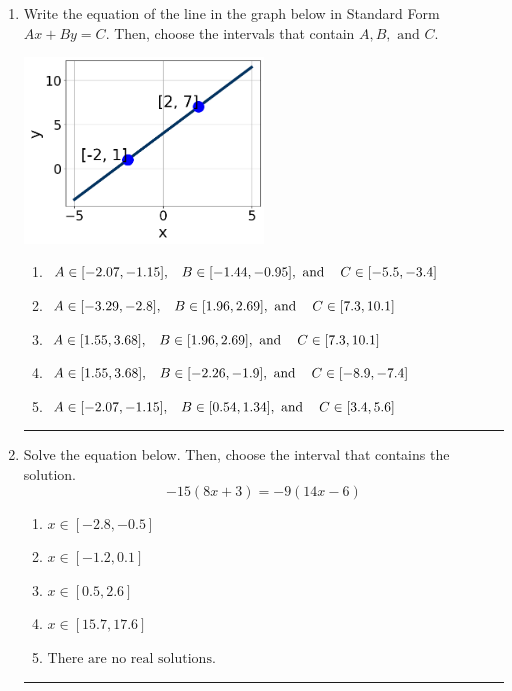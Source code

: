 \documentclass[14pt]{extbook}
\newcommand{\litem}[1]{\item#1\hspace*{-1cm}\rule{\textwidth}{0.4pt}}
\begin{document}
\begin{enumerate}
{\begin{enumerate}[label=\Alph*.]
\end{enumerate} }
\litem{
Write the equation of the line in the graph below in Standard Form $Ax+By=C$. Then, choose the intervals that contain $A, B, \text{ and } C$.
\begin{center}
    \includegraphics[width=0.5\textwidth]{../Figures/linearGraphToStandardC.png}
\end{center}
\begin{enumerate}[label=\Alph*.]
\item \( A \in [-2.07, -1.15], \hspace{3mm} B \in [-1.44, -0.95], \text{ and } \hspace{3mm} C \in [-5.5, -3.4] \)
\item \( A \in [-3.29, -2.8], \hspace{3mm} B \in [1.96, 2.69], \text{ and } \hspace{3mm} C \in [7.3, 10.1] \)
\item \( A \in [1.55, 3.68], \hspace{3mm} B \in [1.96, 2.69], \text{ and } \hspace{3mm} C \in [7.3, 10.1] \)
\item \( A \in [1.55, 3.68], \hspace{3mm} B \in [-2.26, -1.9], \text{ and } \hspace{3mm} C \in [-8.9, -7.4] \)
\item \( A \in [-2.07, -1.15], \hspace{3mm} B \in [0.54, 1.34], \text{ and } \hspace{3mm} C \in [3.4, 5.6] \)

\end{enumerate} }
\litem{
Solve the equation below. Then, choose the interval that contains the solution.\[ -15(8x + 3) = -9(14x -6) \]\begin{enumerate}[label=\Alph*.]
\item \( x \in [-2.8, -0.5] \)
\item \( x \in [-1.2, 0.1] \)
\item \( x \in [0.5, 2.6] \)
\item \( x \in [15.7, 17.6] \)
\item \( \text{There are no real solutions.} \)


\end{enumerate}}
\end{enumerate}
\end{document}
